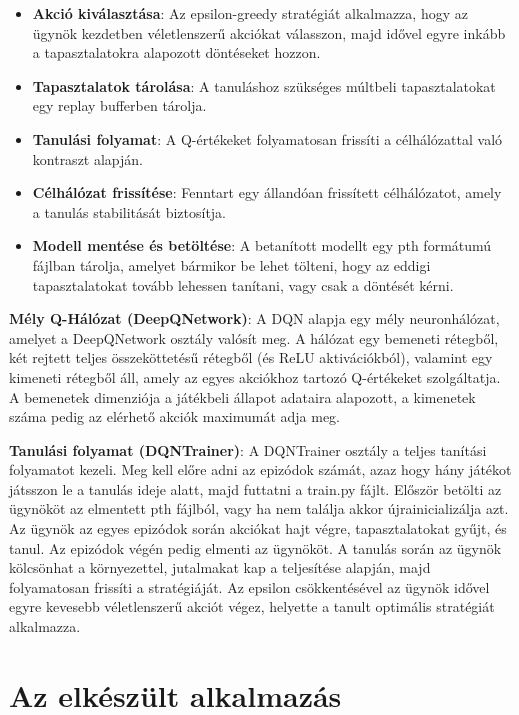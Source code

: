 \documentclass[
]{thesis-ekf}
\theoremstyle{definition}
\theoremstyle{remark}
\begin{document}
\begin{itemize}
	\item \textbf{Akció kiválasztása}: Az epsilon-greedy stratégiát alkalmazza, hogy az ügynök kezdetben véletlenszerű akciókat válasszon, majd idővel egyre inkább a tapasztalatokra alapozott döntéseket hozzon.
	\item \textbf{Tapasztalatok tárolása}: A tanuláshoz szükséges múltbeli tapasztalatokat egy replay bufferben tárolja.
	\item \textbf{Tanulási folyamat}: A Q-értékeket folyamatosan frissíti a célhálózattal való kontraszt alapján.
	\item \textbf{Célhálózat frissítése}: Fenntart egy állandóan frissített célhálózatot, amely a tanulás stabilitását biztosítja.
	\item \textbf{Modell mentése és betöltése}: A betanított modellt egy pth formátumú fájlban tárolja, amelyet bármikor be lehet tölteni, hogy az eddigi tapasztalatokat tovább lehessen tanítani, vagy csak a döntését kérni.
\end{itemize}

\textbf{Mély Q-Hálózat (DeepQNetwork)}: A DQN alapja egy mély neuronhálózat, amelyet a DeepQNetwork osztály valósít meg. A hálózat egy bemeneti rétegből, két rejtett teljes összeköttetésű rétegből (és ReLU aktivációkból), valamint egy kimeneti rétegből áll, amely az egyes akciókhoz tartozó Q-értékeket szolgáltatja. A bemenetek dimenziója a játékbeli állapot adataira alapozott, a kimenetek száma pedig az elérhető akciók maximumát adja meg. 

\textbf{Tanulási folyamat (DQNTrainer)}: A DQNTrainer osztály a teljes tanítási folyamatot kezeli. Meg kell előre adni az epizódok számát, azaz hogy hány játékot játsszon le a tanulás ideje alatt, majd futtatni a train.py fájlt. Először betölti az ügynököt az elmentett pth fájlból, vagy ha nem találja akkor újrainicializálja azt. Az ügynök az egyes epizódok során akciókat hajt végre, tapasztalatokat gyűjt, és tanul. Az epizódok végén pedig elmenti az ügynököt. A tanulás során az ügynök kölcsönhat a környezettel, jutalmakat kap a teljesítése alapján, majd folyamatosan frissíti a stratégiáját. Az epsilon csökkentésével az ügynök idővel egyre kevesebb véletlenszerű akciót végez, helyette a tanult optimális stratégiát alkalmazza. 

\chapter{Az elkészült alkalmazás}
\end{document}
